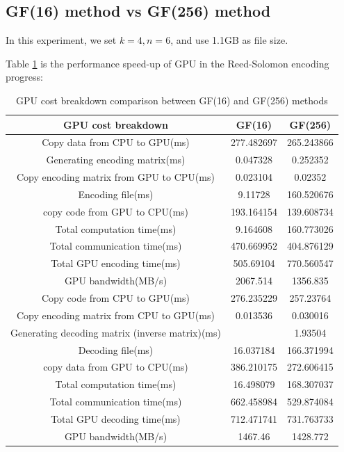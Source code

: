 \documentclass[a4paper]{article}
\begin{document}
\subsection{GF(16) method vs GF(256) method}
In this experiment, we set $k=4, n=6$, and use 1.1GB as file size.

Table \ref{GF16vsGF256} is the performance speed-up of GPU in the Reed-Solomon encoding progress:
\begin{table}
\caption{
GPU cost breakdown comparison between GF(16) and GF(256) methods
}
\begin{center}
\begin{tabular}{|c|c|c|}
\hline
GPU cost breakdown  & GF(16) & GF(256) \\
\hline
Copy data from CPU to GPU(ms)	& 277.482697	& 265.243866 \\
\hline
Generating encoding matrix(ms)	& 0.047328	& 0.252352 \\
\hline
Copy encoding matrix from GPU to CPU(ms)	& 0.023104	& 0.02352 \\
\hline
Encoding file(ms)	& 9.11728	& 160.520676 \\
\hline
copy code from GPU to CPU(ms)	& 193.164154	& 139.608734 \\
\hline
Total computation time(ms)	& 9.164608	& 160.773026 \\
\hline
Total communication time(ms)	& 470.669952	& 404.876129 \\
\hline
Total GPU encoding time(ms)	& 505.69104	& 770.560547 \\
\hline
GPU bandwidth(MB/s)	& 2067.514	& 1356.835 \\
\hline
Copy code from CPU to GPU(ms)	& 276.235229	& 257.23764 \\
\hline
Copy encoding matrix from CPU to GPU(ms)	& 0.013536	& 0.030016 \\
\hline
Generating decoding matrix (inverse matrix)(ms)		& & 1.93504 \\
\hline
Decoding file(ms)	& 16.037184	& 166.371994 \\
\hline
copy data from GPU to CPU(ms)	& 386.210175	& 272.606415 \\
\hline
Total computation time(ms)	& 16.498079	& 168.307037 \\
\hline
Total communication time(ms)	& 662.458984	& 529.874084 \\
\hline
Total GPU decoding time(ms)	& 712.471741	& 731.763733 \\
\hline
GPU bandwidth(MB/s)	& 1467.46	& 1428.772 \\
\hline
\end{tabular}
\label{GF16vsGF256}
\end{center}
\end{table}
\end{document}
